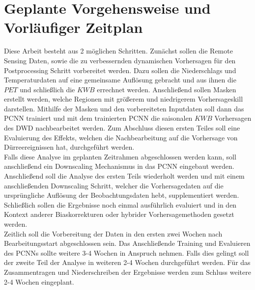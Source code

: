 \documentclass[ba-expose-lentz.tex]{subfile}
\begin{document}
{\let\clearpage\relax \chapter{Geplante Vorgehensweise und Vorläufiger Zeitplan}}\label{zeitplan}

Diese Arbeit besteht aus 2 möglichen Schritten.
Zunächst sollen die Remote Sensing Daten, sowie die zu verbessernden dynamischen Vorhersagen für den Postprocessing Schritt vorbereitet werden.
Dazu sollen die Niederschlags und Temperaturdaten auf eine gemeinsame Auflösung gebracht und aus ihnen die $PET$ und schließlich die $KWB$ errechnet werden.
Anschließend sollen Masken erstellt werden, welche Regionen mit größerem und niedrigerem Vorhersageskill darstellen.
Mithilfe der Masken und den vorbereiteten Inputdaten soll dann das PCNN trainiert und mit dem trainierten PCNN die saisonalen $KWB$ Vorhersagen des DWD nachbearbeitet werden.
Zum Abschluss diesen ersten Teiles soll eine Evaluierung des Effekts, welchen die Nachbearbeitung auf die Vorhersage von Dürreereignissen hat, durchgeführt werden. \\
Falls diese Analyse im geplanten Zeitrahmen abgeschlossen werden kann, soll anschließend ein Downscaling Mechanismus in das PCNN eingebaut werden.
Anschließend soll die Analyse des ersten Teils wiederholt werden und mit einem anschließenden Downscaling Schritt, welcher die Vorhersagedaten auf die ursprüngliche Auflösung der Beobachtungsdaten hebt, supplementiert werden.
Schließlich sollen die Ergebnisse noch einmal ausführlich evaluiert und in den Kontext anderer Biaskorrekturen oder hybrider Vorhersagemethoden gesetzt werden. \\
Zeitlich soll die Vorbereitung der Daten in den ersten zwei Wochen nach Bearbeitungsstart abgeschlossen sein.
Das Anschließende Training und Evaluieren des PCNNs sollte weitere 3-4 Wochen in Anspruch nehmen.
Falls dies gelingt soll der zweite Teil der Analyse in weiteren 2-4 Wochen durchgeführt werden.
Für das Zusammentragen und Niederschreiben der Ergebnisse werden zum Schluss weitere 2-4 Wochen eingeplant.
\end{document}
